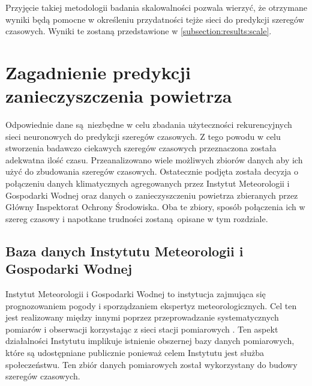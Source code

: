 \documentclass[10pt,a4paper]{article}
\begin{document}
Przyjęcie takiej metodologii badania skalowalności pozwala wierzyć, że otrzymane wyniki będą pomocne w określeniu przydatności tejże sieci do predykcji szeregów czasowych. Wyniki te zostaną przedstawione w \autoref{subsection:results:scale}.

\newpage
\section{Zagadnienie predykcji zanieczyszczenia powietrza}
Odpowiednie dane są niezbędne w celu zbadania użyteczności rekurencyjnych sieci neuronowych do predykcji szeregów czasowych. Z tego powodu w celu stworzenia badawczo ciekawych szeregów czasowych przeznaczona została adekwatna ilość czasu. Przeanalizowano wiele możliwych zbiorów danych aby ich użyć do zbudowania szeregów czasowych. Ostatecznie podjęta została decyzja o połączeniu danych klimatycznych agregowanych przez Instytut Meteorologii i Gospodarki Wodnej oraz danych o zanieczyszczeniu powietrza zbieranych przez Główny Inspektorat Ochrony Środowiska. Oba te zbiory, sposób połączenia ich w szereg czasowy i napotkane trudności zostaną opisane w tym rozdziale. 

\subsection{Baza danych Instytutu Meteorologii i Gospodarki Wodnej}
Instytut Meteorologii i Gospodarki Wodnej to instytucja zajmująca się prognozowaniem pogody i sporządzaniem ekspertyz meteorologicznych. Cel ten jest realizowany między innymi poprzez przeprowadzanie systematycznych pomiarów i obserwacji korzystając z sieci stacji pomiarowych \cite{imgwTask}. Ten aspekt działalności Instytutu implikuje istnienie obszernej bazy danych pomiarowych, które są udostępniane publicznie ponieważ celem Instytutu jest służba społeczeństwu. Ten zbiór danych pomiarowych został wykorzystany do budowy szeregów czasowych. 
\end{document}
